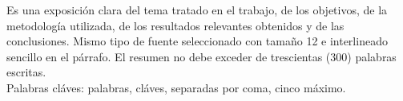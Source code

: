 \documentclass[postgrado]{tesis-usb}
\begin{document}
\frontmatter
\maketitle


\begin{resumen}
     Es una exposici\'on clara del tema tratado en el trabajo, de los objetivos, de la metodolog\'ia utilizada, de los resultados relevantes obtenidos y de las conclusiones. Mismo tipo de fuente seleccionado con tamaño 12 e interlineado sencillo en el p\'arrafo. El resumen no debe exceder de trescientas (300) palabras escritas. \\
     Palabras cl\'aves: palabras, cl\'aves, separadas por coma, cinco m\'aximo.
\end{resumen}
\tableofcontents
\listoffigures
\listoftables
\useacronyms


\mainmatter





\nocite{*}

\appendix


\end{document}
